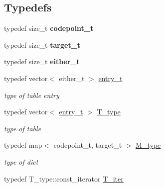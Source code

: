 \subsection*{Typedefs}
\begin{DoxyCompactItemize}
\item 
\hypertarget{namespacejlettvin_a5c480560edc7a71c9f5ae6dad14e6fec}{}typedef size\+\_\+t {\bfseries codepoint\+\_\+t}\label{namespacejlettvin_a5c480560edc7a71c9f5ae6dad14e6fec}

\item 
\hypertarget{namespacejlettvin_ac925326f2732a65f4e3caaea182401a9}{}typedef size\+\_\+t {\bfseries target\+\_\+t}\label{namespacejlettvin_ac925326f2732a65f4e3caaea182401a9}

\item 
\hypertarget{namespacejlettvin_af3d2e8320ecb86b316e2069e9de6e8f2}{}typedef size\+\_\+t {\bfseries either\+\_\+t}\label{namespacejlettvin_af3d2e8320ecb86b316e2069e9de6e8f2}

\item 
\hypertarget{namespacejlettvin_a528bb6b8bb0e10f4e288fcfd3a77ecea}{}typedef vector$<$ either\+\_\+t $>$ \hyperlink{namespacejlettvin_a528bb6b8bb0e10f4e288fcfd3a77ecea}{entry\+\_\+t}\label{namespacejlettvin_a528bb6b8bb0e10f4e288fcfd3a77ecea}

\begin{DoxyCompactList}\small\item\em type of table entry \end{DoxyCompactList}\item 
\hypertarget{namespacejlettvin_a437d12ab773a8e62c0ffce16e6423bb5}{}typedef vector$<$ \hyperlink{namespacejlettvin_a528bb6b8bb0e10f4e288fcfd3a77ecea}{entry\+\_\+t} $>$ \hyperlink{namespacejlettvin_a437d12ab773a8e62c0ffce16e6423bb5}{T\+\_\+type}\label{namespacejlettvin_a437d12ab773a8e62c0ffce16e6423bb5}

\begin{DoxyCompactList}\small\item\em type of table \end{DoxyCompactList}\item 
\hypertarget{namespacejlettvin_a37ff8ef881a4ed6efce44bac38621732}{}typedef map$<$ codepoint\+\_\+t, target\+\_\+t $>$ \hyperlink{namespacejlettvin_a37ff8ef881a4ed6efce44bac38621732}{M\+\_\+type}\label{namespacejlettvin_a37ff8ef881a4ed6efce44bac38621732}

\begin{DoxyCompactList}\small\item\em type of dict \end{DoxyCompactList}\item 
\hypertarget{namespacejlettvin_a717af5c4fa2045ec8271403a711500be}{}typedef T\+\_\+type\+::const\+\_\+iterator \hyperlink{namespacejlettvin_a717af5c4fa2045ec8271403a711500be}{T\+\_\+iter}\label{namespacejlettvin_a717af5c4fa2045ec8271403a711500be}


\end{DoxyCompactItemize}

